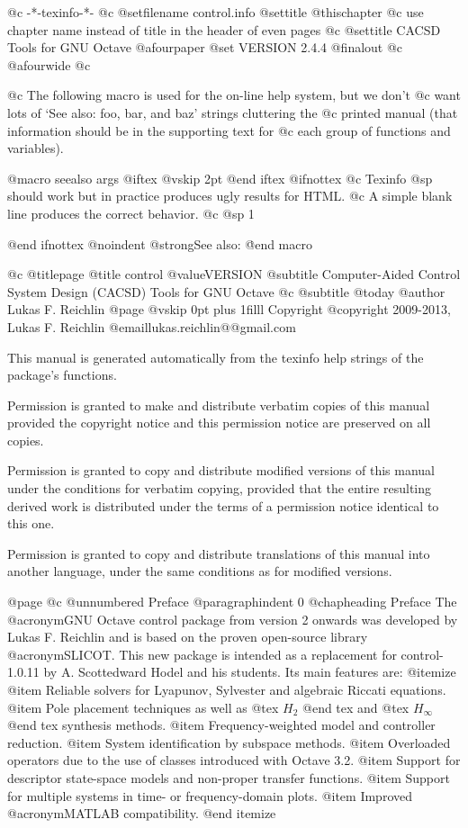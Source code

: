   @c -*-texinfo-*-
@c %
@setfilename control.info
@settitle @thischapter
@c use chapter name instead of title in the header of even pages
@c @settitle CACSD Tools for GNU Octave
@afourpaper
@set VERSION 2.4.4
@finalout
@c @afourwide
@c %


@c The following macro is used for the on-line help system, but we don't
@c want lots of `See also: foo, bar, and baz' strings cluttering the
@c printed manual (that information should be in the supporting text for
@c each group of functions and variables).

@macro seealso {args}
@iftex
@vskip 2pt
@end iftex
@ifnottex
@c Texinfo @sp should work but in practice produces ugly results for HTML.
@c A simple blank line produces the correct behavior. 
@c @sp 1

@end ifnottex
@noindent
@strong{See also:} \args\.
@end macro


@c %
@titlepage
@title control @value{VERSION}
@subtitle Computer-Aided Control System Design (CACSD) Tools for GNU Octave
@c @subtitle @today{}
@author Lukas F. Reichlin
@page
@vskip 0pt plus 1filll
Copyright @copyright{} 2009-2013, Lukas F. Reichlin @email{lukas.reichlin@@gmail.com}

This manual is generated automatically from the texinfo help strings
of the package's functions.

Permission is granted to make and distribute verbatim copies of
this manual provided the copyright notice and this permission notice
are preserved on all copies.

Permission is granted to copy and distribute modified versions of this
manual under the conditions for verbatim copying, provided that the entire
resulting derived work is distributed under the terms of a permission
notice identical to this one.

Permission is granted to copy and distribute translations of this manual
into another language, under the same conditions as for modified versions.


@page
@c @unnumbered Preface
@paragraphindent 0
@chapheading Preface
The @acronym{GNU} Octave control package from version 2 onwards was
developed by Lukas F. Reichlin and is based on the proven open-source
library @acronym{SLICOT}. This new package is intended as a replacement
for control-1.0.11 by A. Scottedward Hodel and his students.
Its main features are:
@itemize
@item Reliable solvers for Lyapunov, Sylvester and algebraic Riccati equations.
@item Pole placement techniques as well as @tex $ H_2 $ @end tex
and @tex $ H_{\infty} $ @end tex
synthesis methods.
@item Frequency-weighted model and controller reduction.
@item System identification by subspace methods.
@item Overloaded operators due to the use of classes introduced with Octave 3.2.
@item Support for descriptor state-space models and non-proper transfer functions.
@item Support for multiple systems in time- or frequency-domain plots.
@item Improved @acronym{MATLAB} compatibility.
@end itemize

